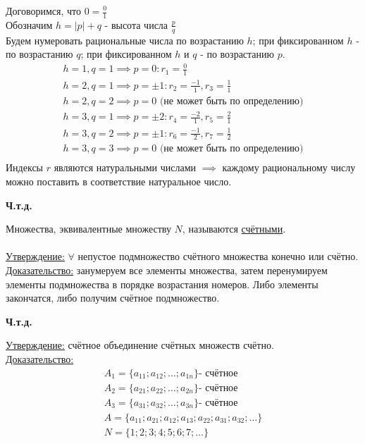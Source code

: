 \documentclass[12pt]{article}
\begin{document}
        \begin{adjustwidth}{1.5em}{1.5em}
        Договоримся, что $0 = \frac{0}{1}$\\
        Обозначим $h = |p| + q$ - высота числа $\frac{p}{q}$\\
        Будем нумеровать рациональные числа по возрастанию $h$; при фиксированном $h$ - по возрастанию $q$; при фиксированном $h$ и $q$ - по возрастанию $p$.\\
        \begin{gather*}
            h = 1, q = 1 \implies p = 0 : r_{1} = \frac{0}{1}\\
            h = 2, q = 1 \implies p = \pm 1 : r_{2} = \frac{-1}{1}, r_{3} = \frac{1}{1}\\
            h = 2, q = 2 \implies p = 0 \text{ (не может быть по определению)}\\
            h = 3, q = 1 \implies p = \pm 2 : r_{4} = \frac{-2}{1}, r_{5} = \frac{2}{1}\\
            h = 3, q = 2 \implies p = \pm 1 : r_{6} = \frac{-1}{2}, r_{7} = \frac{1}{2}\\
            h = 3, q = 3 \implies p = 0 \text{ (не может быть по определению)}\\
        \end{gather*}
        Индексы $r$ являются натуральными числами $\implies$ каждому рациональному числу можно поставить в соответствие натуральное число.
        \end{adjustwidth}
    \begin{center}
        \textbf{Ч.т.д.}
    \end{center}
    Множества, эквивалентные множеству $N$, называются \underline{счётными}.\\\\
    \underline{Утверждение:} $\forall$ непустое подмножество счётного множества конечно или счётно.\\
    \underline{Доказательство:} занумеруем все элементы множества, затем перенумируем элементы подмножества в порядке возрастания номеров. Либо элементы закончатся, либо получим счётное подмножество.
    \begin{center}
        \textbf{Ч.т.д.}
    \end{center}
    \par
    \noindent \underline{Утверждение:} счётное объединение счётных множеств счётно.\\
    \underline{Доказательство:}
    \begin{gather*}
        A_{1} = \{a_{11}; a_{12}; \dots; a_{1n}\} \text{- счётное}\\
        A_{2} = \{a_{21}; a_{22}; \dots; a_{2n}\} \text{- счётное}\\
        A_{3} = \{a_{31}; a_{32}; \dots; a_{3n}\} \text{- счётное}\\
        A = \{a_{11}; a_{21}; a_{12}; a_{13}; a_{22}; a_{31}; a_{32}; \dots\}\\
        N = \{1; 2; 3; 4; 5; 6; 7; \dots\}
    \end{gather*}
\end{document}
